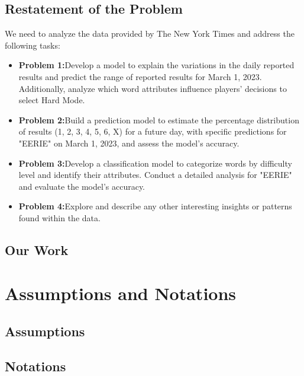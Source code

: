 \documentclass{mcmthesis}  %
\begin{document}
\subsection{Restatement of the Problem}

We need to analyze the data provided by The New York Times and address the following tasks:
\begin{itemize}  %
        \item \textbf{Problem 1:}Develop a model to explain the variations in the daily reported results and predict the 
        range of reported results for March 1, 2023. Additionally, analyze which word attributes influence 
        players' decisions to select Hard Mode.
        \item \textbf{Problem 2:}Build a prediction model to estimate the percentage distribution of results (1, 2, 3, 4, 5, 6, X) 
        for a future day, with specific predictions for "EERIE" on March 1, 2023, and assess the model's accuracy.
        \item \textbf{Problem 3:}Develop a classification model to categorize words by difficulty level and identify their attributes. 
        Conduct a detailed analysis for "EERIE" and evaluate the model's accuracy.
        \item \textbf{Problem 4:}Explore and describe any other interesting insights or patterns found within the data.
\end{itemize}  %

\subsection{Our Work}

\section{Assumptions and Notations}  %
\subsection{Assumptions}


\subsection{Notations}
\end{document}
